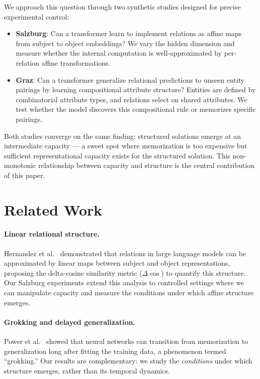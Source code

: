 \documentclass[11pt]{article}
\begin{document}
We approach this question through two synthetic studies designed for precise
experimental control:

\begin{itemize}
\item \textbf{Salzburg}: Can a transformer learn to implement relations as affine maps
  from subject to object embeddings? We vary the hidden dimension and measure whether
  the internal computation is well-approximated by per-relation affine transformations.
\item \textbf{Graz}: Can a transformer generalize relational predictions to unseen
  entity pairings by learning compositional attribute structure? Entities are defined by
  combinatorial attribute types, and relations select on shared attributes. We test
  whether the model discovers this compositional rule or memorizes specific pairings.
\end{itemize}

Both studies converge on the same finding: structured solutions emerge at an
intermediate capacity --- a sweet spot where memorization is too expensive but
sufficient representational capacity exists for the structured solution. This
non-monotonic relationship between capacity and structure is the central contribution
of this paper.

\section{Related Work}

\paragraph{Linear relational structure.}
Hernandez et al.~\cite{hernandez2024} demonstrated that relations in large language
models can be approximated by linear maps between subject and object representations,
proposing the delta-cosine similarity metric ($\Delta\cos$) to quantify this structure.
Our Salzburg experiments extend this analysis to controlled settings where we can
manipulate capacity and measure the conditions under which affine structure emerges.

\paragraph{Grokking and delayed generalization.}
Power et al.~\cite{power2022} showed that neural networks can transition from
memorization to generalization long after fitting the training data, a phenomenon termed
``grokking.'' Our results are complementary: we study the \emph{conditions} under which
structure emerges, rather than its temporal dynamics.
\end{document}
